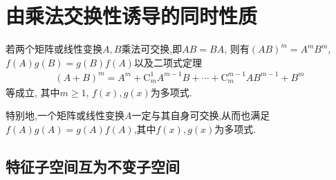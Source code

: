\documentclass[../../main.tex]{subfiles}%
\begin{document}
\section{由乘法交换性诱导的同时性质}

\begin{proposition}[矩阵乘法可交换的基本性质]\label{proposition:矩阵乘法可交换的基本性质}
若两个矩阵或线性变换$A,B$乘法可交换,即\(AB = BA\), 则有\((AB)^{m}=A^{m}B^{m}\), \(f(A)g(B)=g(B)f(A)\)以及二项式定理
\begin{align*}
(A + B)^{m}=A^{m}+\mathrm{C}_{m}^{1}A^{m - 1}B+\cdots+\mathrm{C}_{m}^{m - 1}AB^{m - 1}+B^{m}
\end{align*}
等成立, 其中\(m \geqslant  1\), \(f(x),g(x)\)为多项式. 

特别地,一个矩阵或线性变换$A$一定与其自身可交换,从而也满足\(f(A)g(A)=g(A)f(A)\),其中\(f(x),g(x)\)为多项式.
\end{proposition}

\subsection{特征子空间互为不变子空间}
\end{document}

